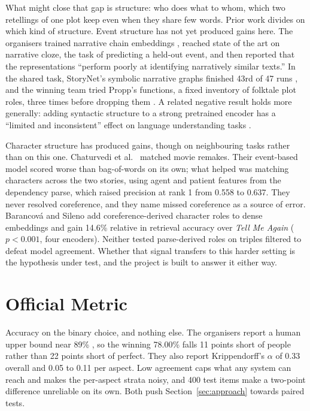 \documentclass[11pt,letterpaper]{article}
\begin{document}
What might close that gap is structure: who does what to whom, which two retellings of one plot keep even when
they share few words. Prior work divides on which kind of structure. Event structure has not yet produced gains
here. The organisers trained narrative chain embeddings \cite{hatzel2023,chambers2008}, reached state of the art
on narrative cloze, the task of predicting a held-out event, and then reported that the representations ``perform
poorly at identifying narratively similar texts.'' In the shared task, StoryNet's symbolic narrative graphs
finished 43rd of 47 runs \cite{storynet}, and the winning team tried Propp's functions, a fixed inventory of
folktale plot roles, three times before dropping them \cite{cognac}. A related negative result holds more
generally: adding syntactic structure to a strong pretrained encoder has a ``limited and inconsistent'' effect on
language understanding tasks \cite{glavas2021}.

Character structure has produced gains, though on neighbouring tasks rather than on this one. Chaturvedi et al.\
\cite{chaturvedi2018} matched movie remakes. Their event-based model scored worse than bag-of-words on its own;
what helped was matching characters across the two stories, using agent and patient features from the dependency
parse, which raised precision at rank 1 from 0.558 to 0.637. They never resolved coreference, and they name
missed coreference as a source of error. Barancov\'a and Sileno \cite{barancova2026} add coreference-derived
character roles to dense embeddings and gain 14.6\% relative in retrieval accuracy over \emph{Tell Me Again}
($p<0.001$, four encoders). Neither tested parse-derived roles on triples filtered to defeat model agreement.
Whether that signal transfers to this harder setting is the hypothesis under test, and the project is built to
answer it either way.

\section{Official Metric}

Accuracy on the binary choice, and nothing else. The organisers report a human upper bound near 89\%
\cite{hatzel2026}, so the winning 78.00\% falls 11 points short of people rather than 22 points short of perfect.
They also report Krippendorff's $\alpha$ of 0.33 overall and 0.05 to 0.11 per aspect. Low agreement caps what any
system can reach and makes the per-aspect strata noisy, and 400 test items make a two-point difference unreliable
on its own. Both push Section~\ref{sec:approach} towards paired tests.
\end{document}
